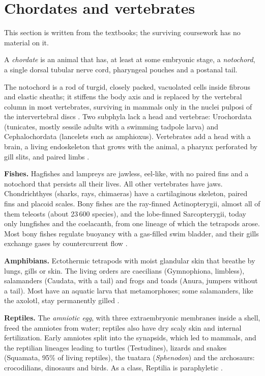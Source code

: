 \section{Chordates and vertebrates}
\label{section-chordates}

This section is written from the textbooks;
the surviving coursework has no material on
it.

\begin{definition}
\label{definition-chordate}
A \emph{chordate} is an animal that has, at
least at some embryonic stage, a
\emph{notochord}, a single dorsal tubular
nerve cord, pharyngeal pouches and a postanal
tail.
\end{definition}

The notochord is a rod of turgid, closely
packed, vacuolated cells inside fibrous and
elastic sheaths; it stiffens the body axis
and is replaced by the vertebral column in
most vertebrates, surviving in mammals only
in the nuclei pulposi of the intervertebral
discs \cite[Chapter 15]{hickman2002animal}.
Two subphyla lack a head and vertebrae:
Urochordata (tunicates, mostly sessile adults
with a swimming tadpole larva) and
Cephalochordata (lancelets such as
amphioxus). Vertebrates add a head with a
brain, a living endoskeleton that grows with
the animal, a pharynx perforated by gill
slits, and paired limbs \cite[Chapter
15]{hickman2002animal}.

\textbf{Fishes.} Hagfishes and lampreys are
jawless, eel-like, with no paired fins and a
notochord that persists all their lives. All
other vertebrates have jaws. Chondrichthyes
(sharks, rays, chimaeras) have a
cartilaginous skeleton, paired fins and
placoid scales. Bony fishes are the
ray-finned Actinopterygii, almost all of them
teleosts (about 23\,600 species), and the
lobe-finned Sarcopterygii, today only
lungfishes and the coelacanth, from one
lineage of which the tetrapods arose. Most
bony fishes regulate buoyancy with a
gas-filled swim bladder, and their gills
exchange gases by countercurrent flow
\cite[Chapter 16]{hickman2002animal}.

\textbf{Amphibians.} Ectothermic tetrapods
with moist glandular skin that breathe by
lungs, gills or skin. The living orders are
caecilians (Gymnophiona, limbless),
salamanders (Caudata, with a tail) and frogs
and toads (Anura, jumpers without a tail).
Most have an aquatic larva that
metamorphoses; some salamanders, like the
axolotl, stay permanently gilled
\cite[Chapter 17]{hickman2002animal}.

\textbf{Reptiles.} The \emph{amniotic egg},
with three extraembryonic membranes inside a
shell, freed the amniotes from water;
reptiles also have dry scaly skin and
internal fertilization. Early amniotes split
into the synapsids, which led to mammals, and
the reptilian lineages leading to turtles
(Testudines), lizards and snakes (Squamata,
95\% of living reptiles), the tuatara
(\emph{Sphenodon}) and the archosaurs:
crocodilians, dinosaurs and birds. As a
class, Reptilia is paraphyletic \cite[Chapter
18]{hickman2002animal}.

